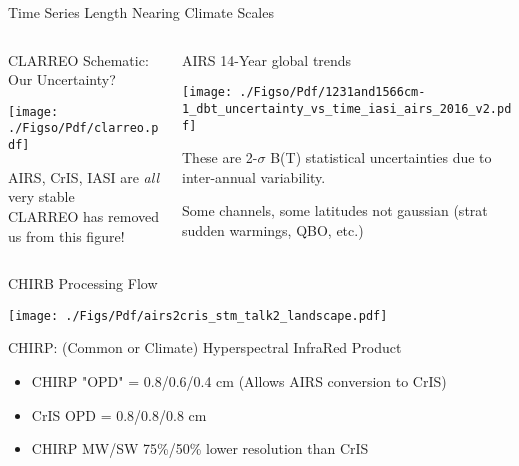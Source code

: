 \documentclass[10pt,t]{beamer}
\begin{document}
\begin{frame}[label={sec:orgd57f67d}]{Time Series Length Nearing Climate Scales}
\vspace{-0.3in}

\begin{columns}
\begin{column}{0.55\columnwidth}
\begin{block}{\footnotesize CLARREO Schematic: Our Uncertainty?}
\begin{center}
\texttt{[image: ./Figso/Pdf/clarreo.pdf]}
\end{center}
\vspace{0.1in}
\footnotesize
AIRS, CrIS, IASI are \emph{all} very stable\\
CLARREO has removed us from this figure!
\end{block}
\end{column}

\begin{column}{0.55\columnwidth}
\begin{block}{\footnotesize AIRS 14-Year global trends}
\begin{center}
\texttt{[image: ./Figso/Pdf/1231and1566cm-1\_dbt\_uncertainty\_vs\_time\_iasi\_airs\_2016\_v2.pdf]}
\end{center}

\footnotesize
These are 2-\(\sigma\) B(T) statistical uncertainties due to inter-annual variability.  

Some channels, some latitudes not gaussian (strat sudden warmings, QBO, etc.)
\end{block}
\end{column}
\end{columns}
\end{frame}

\begin{frame}[label={sec:org04b76d7}]{CHIRB Processing Flow}
\vspace{-0.2in}
\begin{center}
\texttt{[image: ./Figs/Pdf/airs2cris\_stm\_talk2\_landscape.pdf]}
\end{center}

CHIRP: (Common or Climate) Hyperspectral InfraRed Product

\vspace{0.05in}

\small
\begin{itemize}
\item CHIRP "OPD" = 0.8/0.6/0.4 cm  \hspace{0.1in} (Allows AIRS conversion to CrIS)
\item CrIS OPD = 0.8/0.8/0.8 cm
\item CHIRP MW/SW 75\%/50\% lower resolution than CrIS
\end{itemize}
\end{frame}
\end{document}
